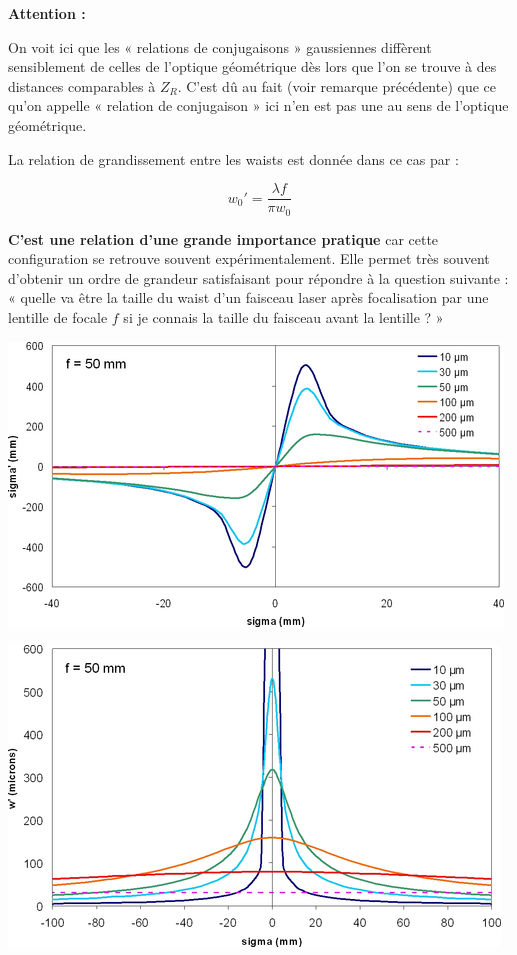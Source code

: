 \documentclass{book}
\begin{document}
\textbf{\color{attention1}Attention :}  
\begin{mdframed}[linecolor=attention1, backgroundcolor=attention2]

On voit ici que les « relations de conjugaisons » gaussiennes diffèrent sensiblement de celles de l'optique géométrique dès lors que l'on se trouve à des distances comparables à $Z_R$. C'est dû au fait (voir remarque précédente) que ce qu'on appelle « relation de conjugaison » ici n'en est pas une au sens de l'optique géométrique.

\end{mdframed}

La relation de grandissement entre les waists est donnée dans ce cas par :

$$w_0' = \frac{\lambda f}{\pi w_0}$$

\textbf{\color{red}C'est une relation d'une grande importance pratique} car cette configuration se retrouve souvent expérimentalement. Elle permet très souvent d'obtenir un ordre de grandeur satisfaisant pour répondre à la question suivante : « quelle va être la taille du waist d'un faisceau laser après focalisation par une lentille de focale $f$ si je connais la taille du faisceau avant la lentille ? »

{\centering
\includegraphics[scale=1.7]{images/fig14.jpg}
\par}

{\centering
\includegraphics[scale=1.7]{images/fig15.jpg}
\par}
\end{document}
